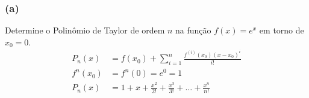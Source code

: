 \documentclass{article}
\begin{document}
\subsubsection{(a)}
Determine o Polinômio de Taylor de ordem $n$ na função $f(x) = e^x$ em torno de
$x_0 = 0$.
\begin{align}
  P_n(x)
  &= f(x_0) + \sum_{i = 1}^n \frac{f^{(i)}(x_0)(x-x_0)^i}{i!} \\
  f^{n}(x_0)
  &= f^{n}(0)
  = e^0
  = 1 \\
  P_n(x)
  &= 1 + x + \frac{x^2}{2!} + \frac{x^3}{3!} + \dots + \frac{x^n}{n!}
\end{align}
\setcounter{equation}{0}
\clearpage
\end{document}
